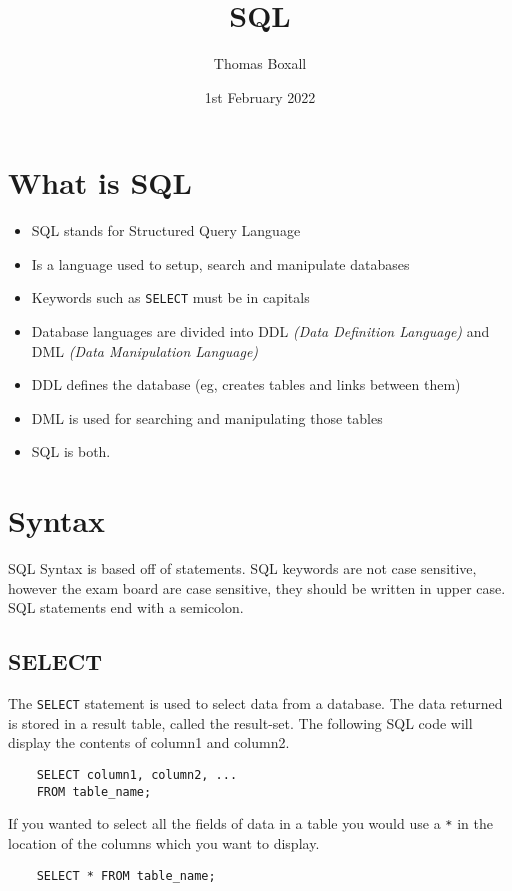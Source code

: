 \documentclass{thomasClass}
\title{SQL}
\author{Thomas Boxall}
\date{1st February 2022}
\begin{document}
\maketitle

\section{What is SQL}
\begin{itemize}
    \item SQL stands for Structured Query Language
    \item Is a language used to setup, search and manipulate databases
    \item Keywords such as \verb|SELECT| must be in capitals
    \item Database languages are divided into DDL \textit{(Data Definition Language)} and DML \textit{(Data Manipulation Language)}
    \item DDL defines the database (eg, creates tables and links between them)
    \item DML is used for searching and manipulating those tables
    \item SQL is both.
\end{itemize}

\section{Syntax}
SQL Syntax is based off of statements. SQL keywords are not case sensitive, however the exam board are case sensitive, they should be written in upper case. SQL statements end with a semicolon.

\subsection{SELECT}
The \verb|SELECT| statement is used to select data from a database. The data returned is stored in a result table, called the result-set.
The following SQL code will display the contents of column1 and column2. 
\begin{verbatim}
    SELECT column1, column2, ...
    FROM table_name;
\end{verbatim}
If you wanted to select all the fields of data in a table you would use a \verb|*| in the location of the columns which you want to display.
\begin{verbatim}
    SELECT * FROM table_name;
\end{verbatim}
\end{document}
